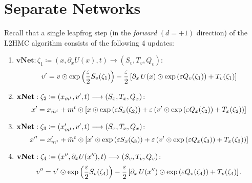 %
\section{Separate Networks}%
\label{sec:separate_networks}
%
Recall that a single leapfrog step (in the \emph{forward} \((d = +1)\)
direction) of the L2HMC algorithm consists of the following 4 updates:
\begin{enumerate}
  \item \(\mathrm{\textbf{vNet}}: \zeta_{1} \coloneqq (x, \partial_{x}U(x), t)
    \longrightarrow (S_{v}, T_{v}, Q_{v})\):
    \begin{equation}
      \vp = v \odot \exp{\left(\frac{\eps}{2}S_{v}(\zeta_{1})\right)}%
             - \frac{\eps}{2}\left[\partial_{x}\,U(x)\odot \exp{\left(\eps
               Q_{v}(\zeta_{1})\right)}%
             + T_{v}(\zeta_{1})\right]
    \end{equation}
  \item \(\mathrm{\mathbf{xNet}}: \zeta_{2} \coloneqq 
    (x_{\bar{m}^{t}}, {v^{\prime}}, t) \longrightarrow (S_{x}, T_{x}, Q_{x})\):
    \begin{equation}
      \xp = x_{\bar{m}^{t}} + m^{t}\odot \left[x \odot \exp{\left(\eps
              S_{x}(\zeta_{2})\right)}%
            + \eps\left(\vp\odot\exp{\left(\eps Q_{x}(\zeta_{2})\right)} 
            + T_{x}(\zeta_{2})\right)\right]
    \end{equation}
  \item \(\mathrm{\mathbf{xNet}}: \zeta_{3} \coloneqq (x_{m^{t}}^{\prime}, {v^{\prime}},
    t) \longrightarrow (S_{x}, T_{x}, Q_{x})\):
    \begin{equation}
      \xpp = x^{\prime}_{m^{t}} + \bar{m}^{t}\odot \left[\xp \odot \exp{\left(\eps
              S_{x}(\zeta_{3})\right)}%
            + \eps\left(\vp\odot\exp{\left(\eps Q_{x}(\zeta_{3})\right)}
            + T_{x}(\zeta_{3})\right)\right]
    \end{equation}
  \item \(\mathrm{\mathbf{vNet}}: \zeta_{4} \coloneqq ({x^{\prime\prime}},
    \partial_{x}U({x^{\prime\prime}}), t) \longrightarrow (S_{v}, T_{v}, Q_{v})\):
    \begin{equation}
      \vpp = \vp \odot \exp{\left(\frac{\eps}{2}S_{v}(\zeta_{4})\right)}%
              - \frac{\eps}{2}\left[\partial_{x}\,U(\xpp)\odot \exp{\left(\eps
                  Q_{v}(\zeta_{4})\right)}%
              + T_{v}(\zeta_{4})\right].
    \end{equation}
\end{enumerate}
%

